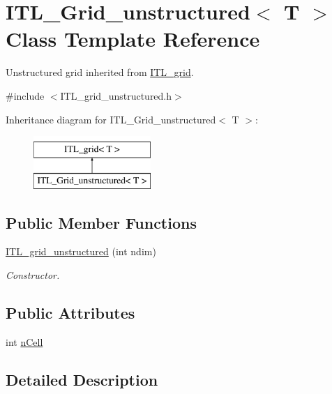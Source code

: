\hypertarget{classITL__Grid__unstructured}{
\section{ITL\_\-Grid\_\-unstructured$<$ T $>$ Class Template Reference}
\label{classITL__Grid__unstructured}
}


Unstructured grid inherited from \hyperlink{classITL__grid}{ITL\_\-grid}.  




{\ttfamily \#include $<$ITL\_\-grid\_\-unstructured.h$>$}

Inheritance diagram for ITL\_\-Grid\_\-unstructured$<$ T $>$:\begin{figure}[H]
\begin{center}
\leavevmode
\includegraphics[height=2cm]{classITL__Grid__unstructured}
\end{center}
\end{figure}
\subsection*{Public Member Functions}
\begin{DoxyCompactItemize}
\item 
\hyperlink{classITL__Grid__unstructured_a05310e279796cc06c54ebe0035860889}{ITL\_\-grid\_\-unstructured} (int ndim)
\begin{DoxyCompactList}\small\item\em Constructor. \item\end{DoxyCompactList}\end{DoxyCompactItemize}
\subsection*{Public Attributes}
\begin{DoxyCompactItemize}
\item 
int \hyperlink{classITL__Grid__unstructured_a070240bebc3f566e00795b017be5b55b}{nCell}
\end{DoxyCompactItemize}


\subsection{Detailed Description}
